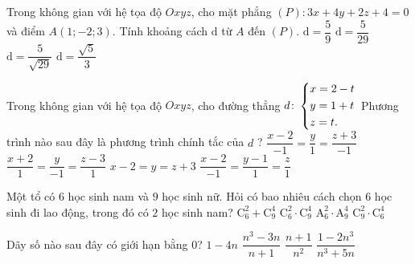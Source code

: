 \begin{ex}%
	Trong không gian với hệ tọa độ $Oxyz$, cho mặt phẳng $(P)\colon 3x+4y+2z+4=0$ và điểm $A(1;-2;3)$. Tính khoảng cách $\mathrm{d}$ từ $A$ đến $(P)$.
	\choice
	{$\mathrm{d}=\dfrac{5}{9}$}
	{$\mathrm{d}=\dfrac{5}{29}$}
	{\True $\mathrm{d}=\dfrac{5}{\sqrt{29}}$}
	{$\mathrm{d}=\dfrac{\sqrt 5}{3}$}
\end{ex}

\begin{ex}%
	Trong không gian với hệ tọa độ $Oxyz$, cho đường thẳng $d\colon \left\{\begin{aligned}&x=2-t\\ &y=1+t\\ &z=t.\end{aligned}\right.$ Phương trình nào sau đây là phương trình chính tắc của $d$ ?
	\choice
	{$\dfrac{x-2}{-1}=\dfrac{y}{1}=\dfrac{z+3}{-1}$}
	{$\dfrac{x+2}{1}=\dfrac{y}{-1}=\dfrac{z-3}{1}$}
	{$x-2=y=z+3$}
	{\True $\dfrac{x-2}{-1}=\dfrac{y-1}{1}=\dfrac{z}{1}$}
\end{ex}

\begin{ex}%
	Một tổ có $6$ học sinh nam và $9$ học sinh nữ. Hỏi có bao nhiêu cách chọn $6$ học sinh đi lao động, trong đó có $2$ học sinh nam?
	\choice
	{$\mathrm{C}_6^2+\mathrm{C}_9^4$}
	{\True $\mathrm{C}_6^2\cdot \mathrm{C}_9^4$}
	{$\mathrm{A}_6^2\cdot \mathrm{A}_9^4$}
	{$\mathrm{C}_9^2\cdot \mathrm{C}_6^4$}
\end{ex}

\begin{ex}%
	Dãy số nào sau đây có giới hạn bằng $0$?
	\choice
	{$1-4n$}
	{$\dfrac{n^3-3n}{n+1}$}
	{\True $\dfrac{n+1}{n^2}$}
	{$\dfrac{1-2n^3}{n^3+5n}$}
\end{ex}

